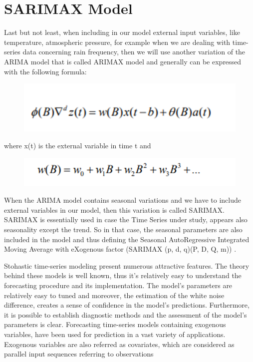\section{SARIMAX Model}
Last but not least, when including in our model external input variables, like temperature, atmospheric pressure, for example when we are dealing with time-series data concerning rain frequency, then we will use another variation of the ARIMA model that is called ARIMAX model and generally can be expressed with the following formula:
\begin{figure}[htbp]
\centering
\includegraphics[width=0.6\linewidth]{project/ARIMAX.png}

\end{figure}
\newline where x(t) is the external variable in time t and
\begin{figure}[htbp]
\centering
\includegraphics[width=0.6\linewidth]{project/w.png}

\end{figure}
When the ARIMA model contains seasonal variations and we have to include external variables in our model, then this variation is called SARIMAX. SARIMAX is essentially used in case the Time Series under study,  appears also seasonality except the trend. So in that case, the seasonal parameters are also included in the model and thus defining the Seasonal AutoRegressive Integrated Moving Average with eXogenous factor (SARIMAX (p, d, q)(P, D, Q, m)) \cite{tarsitano2017short}. \par Stohastic time-series modeling present numerous attractive features. The theory behind these models is well known, thus it's relatively easy to understand the forecasting procedure and its implementation. The model's parameters are relatively easy to tuned and moreover, the estimation of the white noise difference, creates a sense of confidence in the model's predictions. Furthermore, it is possible to establish diagnostic methods and the assessment of the model's parameters is clear. Forecasting time-series models containing exogenous variables, have been used for prediction in a vast variety of applications. Exogenous variables are also referred as covariates, which are considered as parallel input sequences referring to observations 
